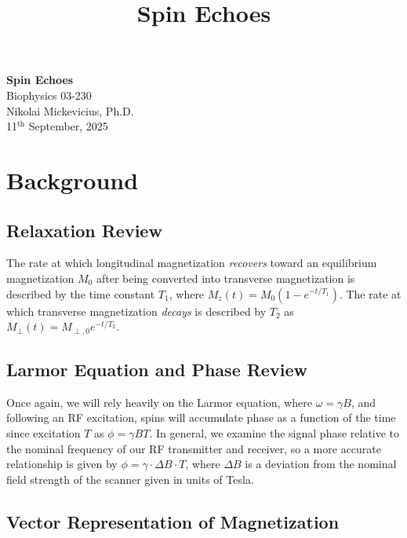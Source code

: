\documentclass[11pt]{article}
\theoremstyle{definition}
\begin{document}
\setcounter{section}{0}
\title{Spin Echoes}

\thispagestyle{empty}

\begin{center}
{\LARGE \bf Spin Echoes}\\
{\large Biophysics 03-230}\\
Nikolai Mickevicius, Ph.D.\\
11$^\text{th}$ September, 2025
\end{center}

\section{Background}

\subsection{Relaxation Review}

The rate at which longitudinal magnetization \emph{recovers} toward an equilibrium magnetization $M_0$ after being converted into transverse magnetization is described by the time constant $T_1$, where $M_z(t) = M_0 \left(1 - e^{-t/T_1} \right)$. The rate at which transverse magnetization \emph{decays} is described by $T_2$ as $M_{\perp}(t) = M_{\perp,0} e^{-t/T_2}$.

\subsection{Larmor Equation and Phase Review}

Once again, we will rely heavily on the Larmor equation, where $\omega = \gamma B$, and following an RF excitation, spins will accumulate phase as a function of the time since excitation $T$ as $\phi = \gamma B T$. In general, we examine the signal phase relative to the nominal frequency of our RF transmitter and receiver, so a more accurate relationship is given by $\phi = \gamma \cdot \Delta B \cdot T$, where $\Delta B$ is a deviation from the nominal field strength of the scanner given in units of Tesla. 

\subsection{Vector Representation of Magnetization}
\end{document}
